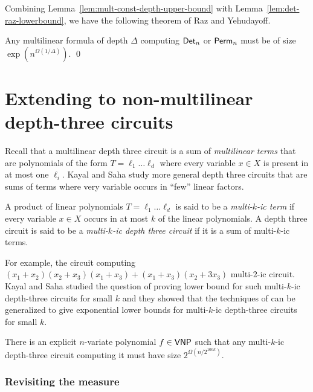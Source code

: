 Combining Lemma~\ref{lem:mult-const-depth-upper-bound} with Lemma~\ref{lem:det-raz-lowerbound}, we have the following theorem of Raz and Yehudayoff. 

\begin{theorem}
Any multilinear formula of depth $\Delta$ computing $\mathsf{Det}_n$ or $\mathsf{Perm}_n$ must be of size $\exp(n^{\Omega(1/\Delta)})$.  \qed
\end{theorem}

\section{Extending to non-multilinear depth-three circuits}

Recall that a multilinear depth three circuit is a sum of \emph{multilinear terms} that are polynomials of the form $T = \ell_1 \dots \ell_d$ where every variable $x \in X$ is present in at most one $\ell_i$. Kayal and Saha \cite{ks15} study more general depth three circuits that are sums of terms where very variable occurs in ``few'' linear factors. 

\begin{definition}
  A product of linear polynomials $T = \ell_1 \dots \ell_d$ is said to be a \emph{multi-$k$-ic term} if every variable $x \in X$ occurs in at most $k$ of the linear polynomials. A depth three circuit is said to be a \emph{multi-$k$-ic depth three circuit} if it is a sum of multi-$k$-ic terms. 
\end{definition} 

For example, the circuit computing $(x_1 + x_2)(x_2 + x_3)(x_1 +x_3) + (x_1 + x_3)(x_2 + 3x_3)$ multi-$2$-ic circuit. \\

Kayal and Saha \cite{ks15} studied the question of proving lower bound for such multi-$k$-ic depth-three circuits for small $k$ and they showed that the techniques of \cite{raz2004} can be generalized to give exponential lower bounds for multi-$k$-ic depth-three circuits for small $k$. 

\begin{theorem}[\cite{ks15}]\label{thm:multi-k-ic} There is an explicit $n$-variate polynomial $f \in \mathsf{VNP}$ such that any multi-$k$-ic depth-three circuit computing it must have size $2^{\Omega(n/2^{100k})}$. 
\end{theorem}

\subsubsection*{Revisiting the measure}


